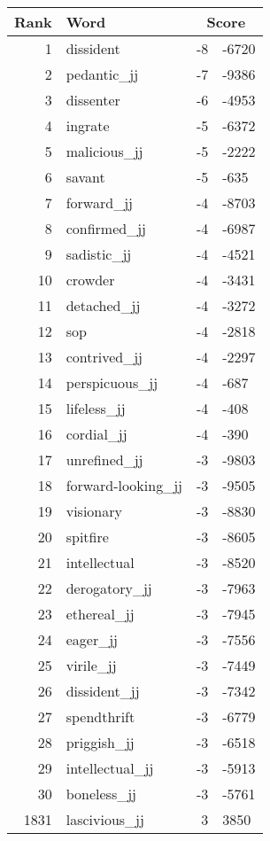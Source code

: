 \begin{longtable}[!htbp]{| rlr@{.}l |}
    \hline
    \textbf{Rank} & \textbf{Word} & \multicolumn{2}{c|}{\textbf{Score}} \\
    \hline
    \endhead
    1 & dissident & -8 & -6720 \\
    2 & pedantic\_jj & -7 & -9386 \\
    3 & dissenter & -6 & -4953 \\
    4 & ingrate & -5 & -6372 \\
    5 & malicious\_jj & -5 & -2222 \\
    6 & savant & -5 & -635 \\
    7 & forward\_jj & -4 & -8703 \\
    8 & confirmed\_jj & -4 & -6987 \\
    9 & sadistic\_jj & -4 & -4521 \\
    10 & crowder & -4 & -3431 \\
    11 & detached\_jj & -4 & -3272 \\
    12 & sop & -4 & -2818 \\
    13 & contrived\_jj & -4 & -2297 \\
    14 & perspicuous\_jj & -4 & -687 \\
    15 & lifeless\_jj & -4 & -408 \\
    16 & cordial\_jj & -4 & -390 \\
    17 & unrefined\_jj & -3 & -9803 \\
    18 & forward-looking\_jj & -3 & -9505 \\
    19 & visionary & -3 & -8830 \\
    20 & spitfire & -3 & -8605 \\
    21 & intellectual & -3 & -8520 \\
    22 & derogatory\_jj & -3 & -7963 \\
    23 & ethereal\_jj & -3 & -7945 \\
    24 & eager\_jj & -3 & -7556 \\
    25 & virile\_jj & -3 & -7449 \\
    26 & dissident\_jj & -3 & -7342 \\
    27 & spendthrift & -3 & -6779 \\
    28 & priggish\_jj & -3 & -6518 \\
    29 & intellectual\_jj & -3 & -5913 \\
    30 & boneless\_jj & -3 & -5761 \\
    1831 & lascivious\_jj & 3 & 3850 \\

\end{longtable}
